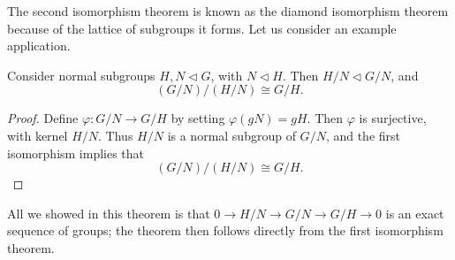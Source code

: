 The second isomorphism theorem is known as the diamond isomorphism theorem because of the lattice of subgroups it forms. Let us consider an example application.

\begin{theorem}
    Consider normal subgroups $H,N \lhd G$, with $N \lhd H$. Then $H/N \lhd G/N$, and
    \[ (G/N)/(H/N) \cong G/H. \]
\end{theorem}
\begin{proof}
    Define $\varphi: G/N \to G/H$ by setting $\varphi(gN) = gH$. Then $\varphi$ is surjective, with kernel $H/N$. Thus $H/N$ is a normal subgroup of $G/N$, and the first isomorphism implies that
    \[ (G/N)/(H/N) \cong G/H. \]
\end{proof}

All we showed in this theorem is that $0 \to H/N \to G/N \to G/H \to 0$ is an exact sequence of groups; the theorem then follows directly from the first isomorphism theorem.

